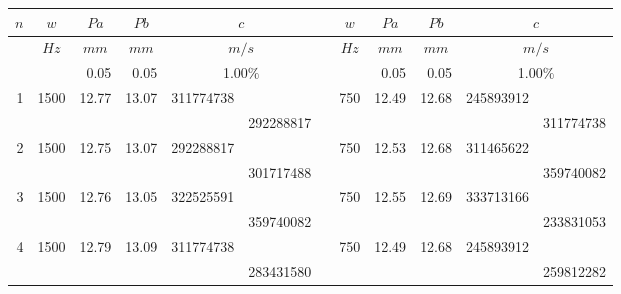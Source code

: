 \begin{table}[htbp]
\begin{center}
\begin{tabular}{|c|c|c|c|c|c|c|c|c|c|c|c|}
\hline
$n$ & $w$ & $Pa$ & $Pb$ & \multicolumn{2}{c|}{$c$}  &  & $w$ & $Pa$ & $Pb$ & \multicolumn{2}{c|}{$c$}  \\ \hline
 & $Hz$ & $mm$ & $mm$ & \multicolumn{2}{c|}{$m/s$}  &  & $Hz$ & $mm$ & $mm$ & \multicolumn{2}{c|}{$m/s$}  \\ \hline
 &  & \multicolumn{1}{r|}{0.05} & \multicolumn{1}{r|}{0.05} & \multicolumn{2}{c|}{1.00$\%$}  &  &  & \multicolumn{1}{r|}{0.05} & \multicolumn{1}{r|}{0.05} & \multicolumn{2}{c|}{1.00$\%$}   \\ \hline
\multicolumn{1}{|r|}{1} & \multicolumn{1}{r|}{1500} & \multicolumn{1}{r|}{12.77} & \multicolumn{1}{r|}{13.07} & \multicolumn{1}{r|}{311774738} &  &  & \multicolumn{1}{r|}{750} & \multicolumn{1}{r|}{12.49} & \multicolumn{1}{r|}{12.68} & \multicolumn{1}{r|}{245893912} &  \\ \hline
 &  &  &  &  & \multicolumn{1}{r|}{292288817} &  &  &  &  &  & \multicolumn{1}{r|}{311774738} \\ \hline
\multicolumn{1}{|r|}{2} & \multicolumn{1}{r|}{1500} & \multicolumn{1}{r|}{12.75} & \multicolumn{1}{r|}{13.07} & \multicolumn{1}{r|}{292288817} &  &  & \multicolumn{1}{r|}{750} & \multicolumn{1}{r|}{12.53} & \multicolumn{1}{r|}{12.68} & \multicolumn{1}{r|}{311465622} &  \\ \hline
 &  &  &  &  & \multicolumn{1}{r|}{301717488} &  &  &  &  &  & \multicolumn{1}{r|}{359740082} \\ \hline
\multicolumn{1}{|r|}{3} & \multicolumn{1}{r|}{1500} & \multicolumn{1}{r|}{12.76} & \multicolumn{1}{r|}{13.05} & \multicolumn{1}{r|}{322525591} &  &  & \multicolumn{1}{r|}{750} & \multicolumn{1}{r|}{12.55} & \multicolumn{1}{r|}{12.69} & \multicolumn{1}{r|}{333713166} &  \\ \hline
 &  &  &  &  & \multicolumn{1}{r|}{359740082} &  &  &  &  &  & \multicolumn{1}{r|}{233831053} \\ \hline
\multicolumn{1}{|r|}{4} & \multicolumn{1}{r|}{1500} & \multicolumn{1}{r|}{12.79} & \multicolumn{1}{r|}{13.09} & \multicolumn{1}{r|}{311774738} &  &  & \multicolumn{1}{r|}{750} & \multicolumn{1}{r|}{12.49} & \multicolumn{1}{r|}{12.68} & \multicolumn{1}{r|}{245893912} &  \\ \hline
 &  &  &  &  & \multicolumn{1}{r|}{283431580} &  &  &  &  &  & \multicolumn{1}{r|}{259812282} \\ \hline

\end{tabular}
\end{center}
\end{table}
